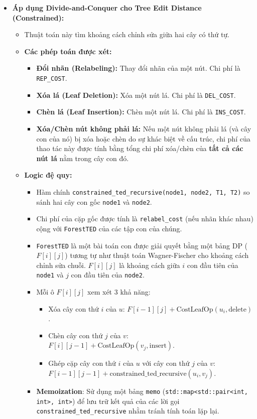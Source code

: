\documentclass{article}
\begin{document}
\begin{itemize}
    \item \textbf{Áp dụng Divide-and-Conquer cho Tree Edit Distance (Constrained):}
    \begin{itemize}
        \item Thuật toán này tìm khoảng cách chỉnh sửa giữa hai cây có thứ tự.
        \item \textbf{Các phép toán được xét:}
        \begin{itemize}
            \item \textbf{Đổi nhãn (Relabeling):} Thay đổi nhãn của một nút. Chi phí là \texttt{REP\_COST}.
            \item \textbf{Xóa lá (Leaf Deletion):} Xóa một nút lá. Chi phí là \texttt{DEL\_COST}.
            \item \textbf{Chèn lá (Leaf Insertion):} Chèn một nút lá. Chi phí là \texttt{INS\_COST}.
            \item \textbf{Xóa/Chèn nút không phải lá:} Nếu một nút không phải lá (và cây con của nó) bị xóa hoặc chèn do sự khác biệt về cấu trúc, chi phí của thao tác này được tính bằng tổng chi phí xóa/chèn của \textbf{tất cả các nút lá} nằm trong cây con đó.
        \end{itemize}
        \item \textbf{Logic đệ quy:}
            \begin{itemize}
                \item Hàm chính \texttt{constrained\_ted\_recursive(node1, node2, T1, T2)} so sánh hai cây con gốc \texttt{node1} và \texttt{node2}.
                \item Chi phí của cặp gốc được tính là \texttt{relabel\_cost} (nếu nhãn khác nhau) cộng với \texttt{ForestTED} của các tập con của chúng.
                \item \texttt{ForestTED} là một bài toán con được giải quyết bằng một bảng DP ($F[i][j]$) tương tự như thuật toán Wagner-Fischer cho khoảng cách chỉnh sửa chuỗi. $F[i][j]$ là khoảng cách giữa $i$ con đầu tiên của \texttt{node1} và $j$ con đầu tiên của \texttt{node2}.
                \item Mỗi ô $F[i][j]$ xem xét 3 khả năng:
                \begin{itemize}
                    \item Xóa cây con thứ $i$ của $u$: $F[i-1][j] + \text{CostLeafOp}(u_i, \text{delete})$.
                    \item Chèn cây con thứ $j$ của $v$: $F[i][j-1] + \text{CostLeafOp}(v_j, \text{insert})$.
                    \item Ghép cặp cây con thứ $i$ của $u$ với cây con thứ $j$ của $v$: $F[i-1][j-1] + \text{constrained\_ted\_recursive}(u_i, v_j)$.
                \end{itemize}
                \item \textbf{Memoization}: Sử dụng một bảng \texttt{memo} (\texttt{std::map<std::pair<int, int>, int>}) để lưu trữ kết quả của các lời gọi \texttt{constrained\_ted\_recursive} nhằm tránh tính toán lặp lại.
            \end{itemize}
    \end{itemize}
\end{itemize}
\end{document}
